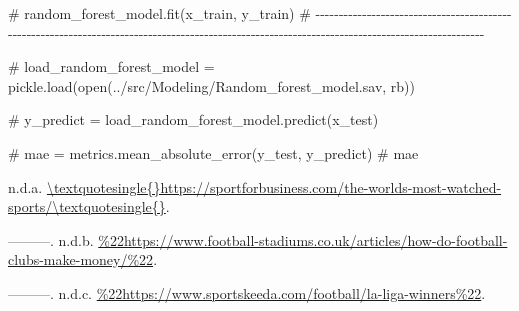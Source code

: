 \documentclass[
  letterpaper,
  DIV=11,
  numbers=noendperiod]{scrartcl}
\newenvironment{Shaded}{\begin{snugshade}}{\end{snugshade}}
\newcommand{\CommentTok}[1]{\textcolor[rgb]{0.37,0.37,0.37}{#1}}
\newlength{\cslhangindent}
\newlength{\cslentryspacingunit} %
\newenvironment{CSLReferences}[2] %
 {%
  \setlength{\parindent}{0pt}
  \ifodd #1
  \let\oldpar\par
  \def\par{\hangindent=\cslhangindent\oldpar}
  \fi
  \setlength{\parskip}{#2\cslentryspacingunit}
 }%
 {}
\begin{document}
\begin{Shaded}
\begin{Highlighting}[]
\CommentTok{\# random\_forest\_model.fit(x\_train, y\_train)}
\CommentTok{\#  {-}{-}{-}{-}{-}{-}{-}{-}{-}{-}{-}{-}{-}{-}{-}{-}{-}{-}{-}{-}{-}{-}{-}{-}{-}{-}{-}{-}{-}{-}{-}{-}{-}{-}{-}{-}{-}{-}{-}{-}{-}{-}{-}{-}{-}{-}{-}{-}{-}{-}{-}{-}{-}{-}{-}{-}{-}{-}{-}{-}{-}{-}{-}{-}{-}{-}{-}{-}{-}{-}{-}{-}{-}{-}{-}{-}{-}{-}{-}{-}{-}{-}{-}{-}{-}{-}{-}{-}{-}{-}{-}{-}{-}{-}{-}{-}{-}{-}{-}{-}{-}{-}{-}{-}{-}{-}{-}{-}{-}{-}{-}{-}{-}{-}{-}{-}{-}{-}{-}{-}{-}{-}{-}{-}{-}{-}{-}{-}{-}{-}{-}{-}{-}{-}{-}{-}{-}{-}{-}{-}{-}{-}{-}{-}}

\CommentTok{\# load\_random\_forest\_model = pickle.load(open(\textquotesingle{}../src/Modeling/Random\_forest\_model.sav\textquotesingle{}, \textquotesingle{}rb\textquotesingle{}))}
\end{Highlighting}
\end{Shaded}

\begin{Shaded}
\begin{Highlighting}[]
\CommentTok{\# y\_predict = load\_random\_forest\_model.predict(x\_test)}

\CommentTok{\# mae = metrics.mean\_absolute\_error(y\_test, y\_predict)}
\CommentTok{\# mae}
\end{Highlighting}
\end{Shaded}

\hypertarget{refs}{}
\begin{CSLReferences}{1}{0}
\leavevmode{}%
n.d.a.
\url{\textquotesingle{}https://sportforbusiness.com/the-worlds-most-watched-sports/\textquotesingle{}}.

\leavevmode{}%
---------. n.d.b.
\url{\%22https://www.football-stadiums.co.uk/articles/how-do-football-clubs-make-money/\%22}.

\leavevmode{}%
---------. n.d.c.
\url{\%22https://www.sportskeeda.com/football/la-liga-winners\%22}.

\end{CSLReferences}
\end{document}
